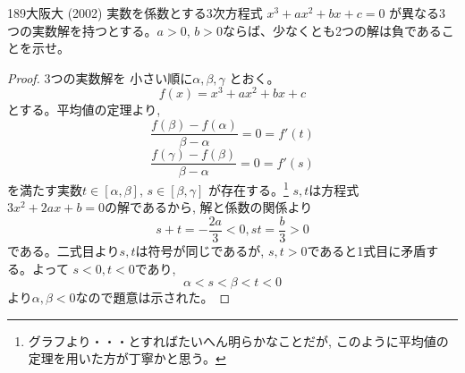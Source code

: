 \begin{prob}{189}{}{大阪大 (2002)}
 実数を係数とする3次方程式 $x^3+ax^2+bx+c=0$ が異なる3つの実数解を持つとする。$a>0$, $b>0$ならば、少なくとも2つの解は負であることを示せ。
\end{prob}

\begin{proof}
3つの実数解を 小さい順に$\alpha, \beta ,\gamma$ とおく。
\[f(x)=x^3+ax^2+bx+c\]
とする。平均値の定理より, 
\[\dfrac{f(\beta) -f(\alpha)}{\beta -\alpha}=0=f'(t) \]
\[\dfrac{f(\gamma) -f(\beta)}{\beta -\alpha}=0=f'(s) \]
を満たす実数$t\in [\alpha, \beta]$, $s\in [\beta , \gamma]$ が存在する。\footnote{グラフより・・・とすればたいへん明らかなことだが, このように平均値の定理を用いた方が丁寧かと思う。}
$s,t$は方程式 $3x^2 + 2ax +b=0$の解であるから, 解と係数の関係より
\[s+t=-\dfrac{2a}{3}<0,　　st=\dfrac{b}{3}>0\]
である。二式目より$s, t$は符号が同じであるが, $s,t>0$であると1式目に矛盾する。よって $s<0 , t<0$であり, 
\[\alpha< s< \beta < t<0\]
より$\alpha,\beta <0$なので題意は示された。%
\end{proof}